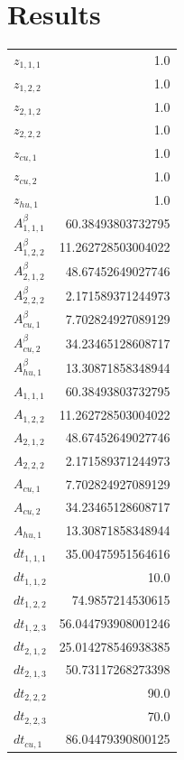 \documentclass{article}%
\makeatletter
\let\mcnewpage=\newpage%
\newcommand{\TrickSupertabularIntoMulticols}{%
\renewcommand\newpage{%
\if@firstcolumn%
\hrule width\linewidth height0pt%
\columnbreak%
\else%
\mcnewpage%
\fi%
}%
}%
\makeatother
\begin{document}
\section{Results}%
\thispagestyle{plain}%
\begin{multicols*}{3}%
\TrickSupertabularIntoMulticols%
%
\begin{supertabular}{lr}%
	$z_{1,1,1}$ & 1.0 \\%
	$z_{1,2,2}$ & 1.0 \\%
	$z_{2,1,2}$ & 1.0 \\%
	$z_{2,2,2}$ & 1.0 \\%
	$z_{cu,1}$ & 1.0 \\%
	$z_{cu,2}$ & 1.0 \\%
	$z_{hu,1}$ & 1.0 \\%
	$A_{1,1,1}^{\beta}$ & 60.38493803732795 \\%
	$A_{1,2,2}^{\beta}$ & 11.262728503004022 \\%
	$A_{2,1,2}^{\beta}$ & 48.67452649027746 \\%
	$A_{2,2,2}^{\beta}$ & 2.171589371244973 \\%
	$A_{cu,1}^{\beta}$ & 7.702824927089129 \\%
	$A_{cu,2}^{\beta}$ & 34.23465128608717 \\%
	$A_{hu,1}^{\beta}$ & 13.30871858348944 \\%
	$A_{1,1,1}$ & 60.38493803732795 \\%
	$A_{1,2,2}$ & 11.262728503004022 \\%
	$A_{2,1,2}$ & 48.67452649027746 \\%
	$A_{2,2,2}$ & 2.171589371244973 \\%
	$A_{cu,1}$ & 7.702824927089129 \\%
	$A_{cu,2}$ & 34.23465128608717 \\%
	$A_{hu,1}$ & 13.30871858348944 \\%
	$dt_{1,1,1}$ & 35.00475951564616 \\%
	$dt_{1,1,2}$ & 10.0 \\%
	$dt_{1,2,2}$ & 74.9857214530615 \\%
	$dt_{1,2,3}$ & 56.044793908001246 \\%
	$dt_{2,1,2}$ & 25.014278546938385 \\%
	$dt_{2,1,3}$ & 50.73117268273398 \\%
	$dt_{2,2,2}$ & 90.0 \\%
	$dt_{2,2,3}$ & 70.0 \\%
	$dt_{cu,1}$ & 86.04479390800125 \\%

\end{supertabular}
\end{multicols*}
\end{document}
